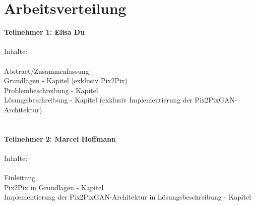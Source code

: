 \chapter*{Arbeitsverteilung}

\textbf{Teilnehmer 1:  Elisa Du} \\
\\
 Inhalte: \\
\\ Abstract/Zusammenfassung
\\ Grundlagen - Kapitel (exklusiv Pix2Pix)
\\ Problembeschreibung - Kapitel
\\ Lösungsbeschreibung - Kapitel (exklusiv Implementierung der Pix2PixGAN-Architektur)
\\ 
\\
\\
\textbf{Teilnehmer 2: Marcel Hoffmann} \\
\\
 Inhalte: \\
\\ Einleitung
\\ Pix2Pix in Grundlagen - Kapitel
\\ Implementierung der Pix2PixGAN-Architektur in Lösungsbeschreibung - Kapitel
\\ 
\\
\\
